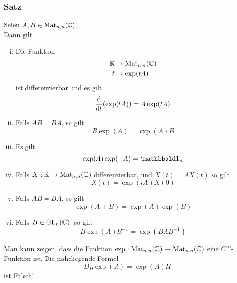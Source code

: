 \subsubsection{Satz} %
\label{ssub:satz}
Seien $A,B \in \operatorname{Mat}_{n,n}(\mathbb{C})$. \\
Dann gilt
\begin{enumerate}[(i)]
	\item Die Funktion 
	\begin{align*}
		\mathbb{R} &\to \operatorname{Mat}_{n,n}(\mathbb{C}) \\
		t &\mapsto \exp(tA)
	\end{align*}
	ist differenzierbar und es gilt
	\[
		\frac{\mathrm{d}\mkern-1.0mu }{\mathrm{d}\mkern-1.0mu t} (\exp(tA)) = A \exp(tA)
	\]
	\item Falls $AB=BA$, so gilt\[
		B \exp(A) = \exp(A)B
	\]
	\item Es gilt \[
		\exp(A)\exp(-A)= \ind_n
	\]
	\item Falls $X: \mathbb{R} \to \operatorname{Mat}_{n,n}(\mathbb{C})$ differenzierbar, und $\dot X(t)= AX(t)$
	so gilt
	\[
		X(t)=\exp(tA)X(0)
	\]
	\item Falls $AB=BA$, so gilt 
	\[
		\exp(A+B)=\exp(A)\exp(B)
	\]
	\item Falls $B \in \operatorname{GL}_n(\mathbb{C})$, so gilt
	\[
		B \exp(A)B^{-1}= \exp(BAB^{-1})
	\]
\end{enumerate}
Man kann zeigen, dass die Funktion $\exp: \operatorname{Mat}_{n,n}(\mathbb{C}) \to \operatorname{Mat}_{n,n}(\mathbb{C})$ eine $C^{\infty}$-Funktion ist. Die naheliegende Formel
\[
	D_H \exp(A) = \exp(A) H
\] ist \underline{Falsch!}

